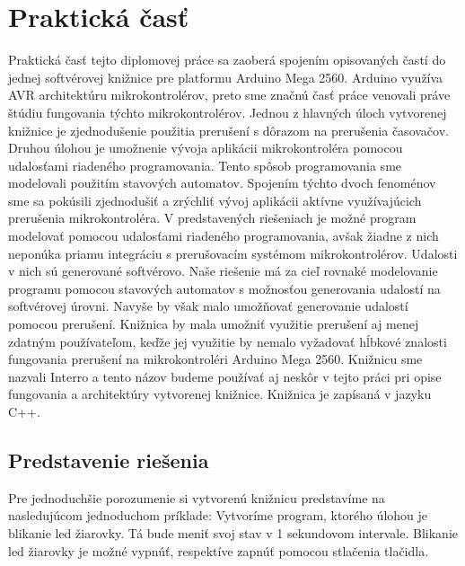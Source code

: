 \section{Praktická časť}
\noindent

Praktická časť tejto diplomovej práce sa zaoberá spojením opisovaných častí do jednej softvérovej knižnice pre platformu Arduino Mega 2560. Arduino využíva AVR
architektúru mikrokontrolérov, preto sme značnú časť práce venovali práve štúdiu fungovania týchto mikrokontrolérov.
Jednou z hlavných úloch vytvorenej knižnice je zjednodušenie použitia prerušení s dôrazom na prerušenia časovačov.
Druhou úlohou je umožnenie vývoja aplikácii mikrokontroléra pomocou udalosťami riadeného programovania. Tento spôsob programovania sme modelovali použitím stavových
automatov. Spojením týchto dvoch fenoménov sme sa pokúsili zjednodušiť a zrýchliť vývoj aplikácii aktívne využívajúcich prerušenia mikrokontroléra.
V predstavených riešeniach je možné program modelovať pomocou udalosťami riadeného programovania,
avšak žiadne z nich neponúka priamu integráciu s prerušovacím systémom mikrokontrolérov. Udalosti v nich sú generované softvérovo. Naše riešenie má za cieľ rovnaké
modelovanie programu pomocou stavových automatov s možnosťou generovania udalostí na softvérovej úrovni. Navyše by však malo umožňovať generovanie udalostí pomocou
prerušení. Knižnica by mala umožniť využitie  prerušení aj menej zdatným používateľom, keďže jej využitie by nemalo vyžadovať hĺbkové znalosti fungovania prerušení na mikrokontroléri Arduino Mega 2560.
Knižnicu sme nazvali Interro a tento názov budeme používať aj neskôr v tejto práci pri opise fungovania a architektúry vytvorenej knižnice. Knižnica je zapísaná v jazyku C++.

\subsection{Predstavenie riešenia}
\noindent
Pre jednoduchšie porozumenie si vytvorenú knižnicu predstavíme na nasledujúcom jednoduchom príklade: Vytvoríme program, ktorého úlohou je blikanie led žiarovky.
Tá bude meniť svoj stav v 1 sekundovom intervale. Blikanie led žiarovky je možné vypnúť, respektíve zapnúť pomocou stlačenia tlačidla.

